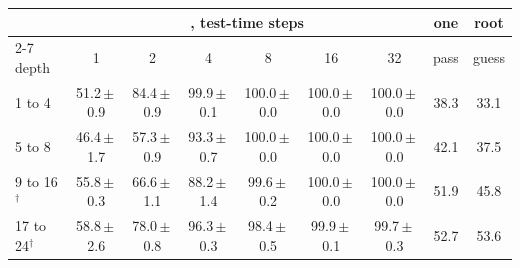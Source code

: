 \begin{tabular}{lcccccccc}
\toprule
& \multicolumn{6}{c}{\zr{}, test-time steps} & one & root \\
\cmidrule(lr){2-7}
depth & 1 & 2 & 4 & 8 & 16 & 32 & pass & guess \\
\midrule
1 to 4 & 51.2\,$\pm$\,0.9 & 84.4\,$\pm$\,0.9 & 99.9\,$\pm$\,0.1 & 100.0\,$\pm$\,0.0 & 100.0\,$\pm$\,0.0 & 100.0\,$\pm$\,0.0 & 38.3 & 33.1 \\
5 to 8 & 46.4\,$\pm$\,1.7 & 57.3\,$\pm$\,0.9 & 93.3\,$\pm$\,0.7 & 100.0\,$\pm$\,0.0 & 100.0\,$\pm$\,0.0 & 100.0\,$\pm$\,0.0 & 42.1 & 37.5 \\
9 to 16$^\dagger$ & 55.8\,$\pm$\,0.3 & 66.6\,$\pm$\,1.1 & 88.2\,$\pm$\,1.4 & 99.6\,$\pm$\,0.2 & 100.0\,$\pm$\,0.0 & 100.0\,$\pm$\,0.0 & 51.9 & 45.8 \\
17 to 24$^\dagger$ & 58.8\,$\pm$\,2.6 & 78.0\,$\pm$\,0.8 & 96.3\,$\pm$\,0.3 & 98.4\,$\pm$\,0.5 & 99.9\,$\pm$\,0.1 & 99.7\,$\pm$\,0.3 & 52.7 & 53.6 \\
\bottomrule
\end{tabular}
